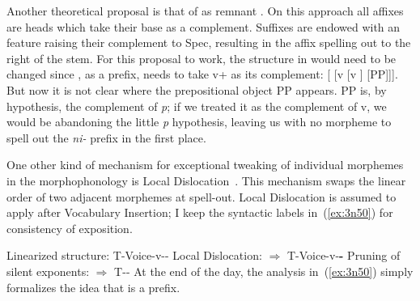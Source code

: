 \begin{exe}
\begin{xlist}
\begin{xlist}
\begin{exe}
\begin{xlist}
\begin{xlist}
\begin{exe}
\begin{xlist}
\begin{xlist}
\begin{exe}
\begin{exe}
\begin{xlist}
\begin{exe}
\begin{exe}
\begin{xlist}
\begin{exe}
\begin{exe}
\begin{exe}
\begin{exe}
\begin{exe}
\begin{xlist}
\begin{exe}
\begin{xlist}
\begin{exe}
\begin{exe}
\begin{xlist}
\begin{exe}
\begin{xlist}
\begin{exe}
\begin{xlist}
\begin{exe}
\begin{exe}
\begin{exe}
\begin{xlist}
\begin{exe}
\begin{exe}
\begin{exe}
\begin{xlist}
\begin{exe}
\begin{xlist}
\begin{exe}
\begin{exe}
\begin{xlist}
\begin{exe}
\begin{exe}
\begin{exe}
\begin{exe}
\begin{xlist}
\begin{exe}
\begin{xlist}
\begin{exe}
\begin{xlist}
\begin{exe}
\begin{xlist}
\begin{exe}
\begin{xlist}
\begin{exe}
\begin{xlist}
\begin{exe}
\begin{exe}
\begin{xlist}
Another theoretical proposal is that of  as remnant  \citep{koopmanszabolcsi00,koopman05,koopman15u20}. On this approach all affixes are heads which take their base as a complement. Suffixes are endowed with an  feature raising their complement to Spec, resulting in the affix spelling out to the right of the stem. For this proposal to work, the structure in  would need to be changed since \pz, as a prefix, needs to take v+ as its complement: [{\pz} [v [v ] [PP]]]. But now it is not clear where the prepositional object PP appears. PP is, by hypothesis, the complement of \emph{p}; if we treated it as the complement of v, we would be abandoning the little \emph{p} hypothesis, leaving us with no morpheme to spell out the \emph{ni-} prefix in the first place.

One other kind of mechanism for exceptional tweaking of individual morphemes in the morphophonology is Local Dislocation~\citep{embicknoyer01}. This mechanism swaps the linear order of two adjacent morphemes at spell-out. Local Dislocation is assumed to apply after Vocabulary Insertion; I keep the syntactic labels in~(\ref{ex:3n50}) for consistency of exposition.
 \begin{exe}
 \ex  \label{ex:3n50}
 \begin{xlist} 
 	\ex  Linearized structure: 
		T-Voice-v--\pz
 	\ex  Local Dislocation: 
		$\Rightarrow$ T-Voice-v-\textbf{\pz-}
 	\ex  Pruning of silent exponents: 
		$\Rightarrow$ T-\pz-
 \z
\z 
At the end of the day, the analysis in~(\ref{ex:3n50}) simply formalizes the idea that {\pz} is a prefix.


\end{xlist}
\end{exe}
\end{xlist}
\end{exe}
\end{exe}
\end{xlist}
\end{exe}
\end{xlist}
\end{exe}
\end{xlist}
\end{exe}
\end{xlist}
\end{exe}
\end{xlist}
\end{exe}
\end{xlist}
\end{exe}
\end{exe}
\end{exe}
\end{exe}
\end{xlist}
\end{exe}
\end{exe}
\end{xlist}
\end{exe}
\end{xlist}
\end{exe}
\end{exe}
\end{exe}
\end{xlist}
\end{exe}
\end{exe}
\end{exe}
\end{xlist}
\end{exe}
\end{xlist}
\end{exe}
\end{xlist}
\end{exe}
\end{exe}
\end{xlist}
\end{exe}
\end{xlist}
\end{exe}
\end{exe}
\end{exe}
\end{exe}
\end{exe}
\end{xlist}
\end{exe}
\end{exe}
\end{xlist}
\end{exe}
\end{exe}
\end{xlist}
\end{xlist}
\end{exe}
\end{xlist}
\end{xlist}
\end{exe}
\end{xlist}
\end{xlist}
\end{exe}
